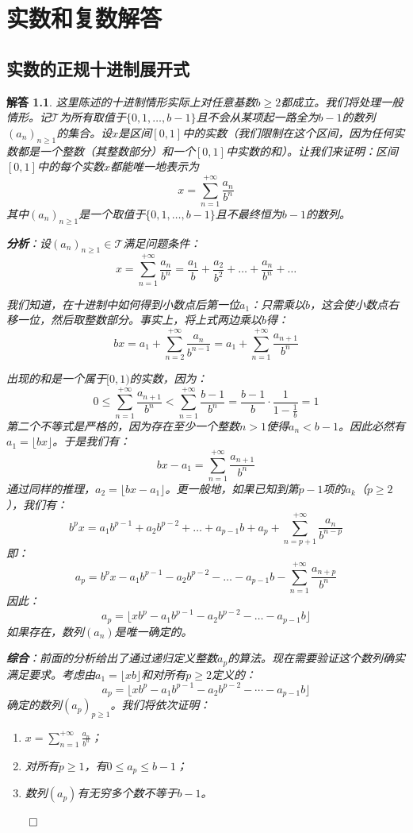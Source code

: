 \documentclass[12pt,UTF8,fontset=none]{ctexbook}
\theoremstyle{exercisestyle}
\theoremstyle{solutionstyle}
\newtheorem*{solution*}{解答}
\newenvironment{solution}
  {\begin{solution*}}
  {\hfill\ensuremath{\qed}\end{solution*}}
\begin{document}
\appendix


\chapter{实数和复数解答}
\section{实数的正规十进制展开式}
\begin{solution}
这里陈述的十进制情形实际上对任意基数$b \geq 2$都成立。我们将处理一般情形。记$\mathcal T$为所有取值于$\{0,1,\ldots,b-1\}$且不会从某项起一路全为$b-1$的数列$(a_n)_{n\geq 1}$的集合。设$x$是区间$[0,1]$中的实数（我们限制在这个区间，因为任何实数都是一个整数（其整数部分）和一个$[0,1]$中实数的和）。让我们来证明：区间$[0,1]$中的每个实数$x$都能唯一地表示为
$$x = \sum_{n=1}^{+\infty} \frac{a_n}{b^n}$$
其中$(a_n)_{n \geq 1}$是一个取值于$\{0,1,\ldots,b-1\}$且不最终恒为$b-1$的数列。

\textbf{分析}：设$(a_n)_{n\geqslant 1} \in \mathcal T$满足问题条件：
$$x = \sum_{n=1}^{+\infty} \frac{a_n}{b^n} = \frac{a_1}{b} + \frac{a_2}{b^2} + \dots + \frac{a_n}{b^n} + \dots$$

我们知道，在十进制中如何得到小数点后第一位$a_1$：只需乘以$b$，这会使小数点右移一位，然后取整数部分。事实上，将上式两边乘以$b$得：
$$bx = a_1 + \sum_{n=2}^{+\infty} \frac{a_n}{b^{n-1}} = a_1 + \sum_{n=1}^{+\infty} \frac{a_{n+1}}{b^n}$$

出现的和是一个属于$[0,1)$的实数，因为：
$$0 \leqslant \sum_{n=1}^{+\infty} \frac{a_{n+1}}{b^n} < \sum_{n=1}^{+\infty} \frac{b-1}{b^n} = \frac{b-1}{b} \cdot \frac{1}{1 - \frac{1}{b}} = 1$$
第二个不等式是严格的，因为存在至少一个整数$n > 1$使得$a_n < b - 1$。因此必然有$a_1 = \lfloor bx \rfloor$。于是我们有：
$$bx - a_1 = \sum_{n=1}^{+\infty} \frac{a_{n+1}}{b^n}$$
通过同样的推理，$a_2 = \lfloor bx - a_1 \rfloor$。更一般地，如果已知到第$p-1$项的$a_k$（$p \geqslant 2$），我们有：
$$b^p x = a_1 b^{p-1} + a_2 b^{p-2} + \dots + a_{p-1} b + a_p + \sum_{n=p+1}^{+\infty} \frac{a_n}{b^{n-p}}$$
即：
$$a_p = b^p x - a_1 b^{p-1} - a_2 b^{p-2} - \dots - a_{p-1} b - \sum_{n=1}^{+\infty} \frac{a_{n+p}}{b^n}$$
因此：
$$a_p = \lfloor x b^p - a_1 b^{p-1} - a_2 b^{p-2} - \dots - a_{p-1} b \rfloor$$
如果存在，数列$(a_n)$是唯一确定的。

\textbf{综合}：前面的分析给出了通过递归定义整数$a_p$的算法。现在需要验证这个数列确实满足要求。考虑由$a_1 = \lfloor xb \rfloor$和对所有$p \ge 2$定义的：
$$a_p = \lfloor xb^p - a_1b^{p-1} - a_2b^{p-2} - \cdots - a_{p-1}b \rfloor$$
确定的数列$(a_p)_{p\geq 1}$。我们将依次证明：
\begin{enumerate}
    \item $x = \sum_{n=1}^{+\infty} \frac{a_n}{b^n}$；
    \item 对所有$p \geqslant 1$，有$0 \leqslant a_p \leqslant b - 1$；
    \item 数列$(a_p)$有无穷多个数不等于$b - 1$。
\end{enumerate}


\end{solution}
\end{document}
